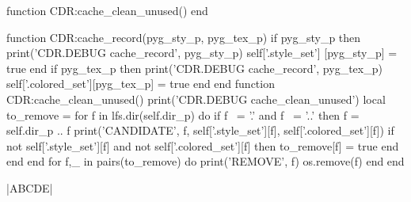 \noindent
\makeatletter

\ExplSyntaxOn





\begin{luacode}

function CDR:cache_clean_unused()
end

function CDR:cache_record(pyg_sty_p, pyg_tex_p)
  if pyg_sty_p then
print('CDR.DEBUG cache_record', pyg_sty_p)
    self['.style_set']  [pyg_sty_p] = true
  end
  if pyg_tex_p then
print('CDR.DEBUG cache_record', pyg_tex_p)
    self['.colored_set'][pyg_tex_p] = true
  end
end
function CDR:cache_clean_unused()
print('CDR.DEBUG cache_clean_unused')
  local to_remove = {}
  for f in lfs.dir(self.dir_p) do
    if f ~= '.' and f ~= '..' then
      f = self.dir_p .. f
print('CANDIDATE', f, self['.style_set'][f], self['.colored_set'][f])
      if not self['.style_set'][f] and not self['.colored_set'][f] then
        to_remove[f] = true
      end
    end
  end
  for f,_ in pairs(to_remove) do
print('REMOVE', f)
    os.remove(f)
  end
end

\end{luacode}

\bgroup

\CDRCode|ABCDE|

\egroup
